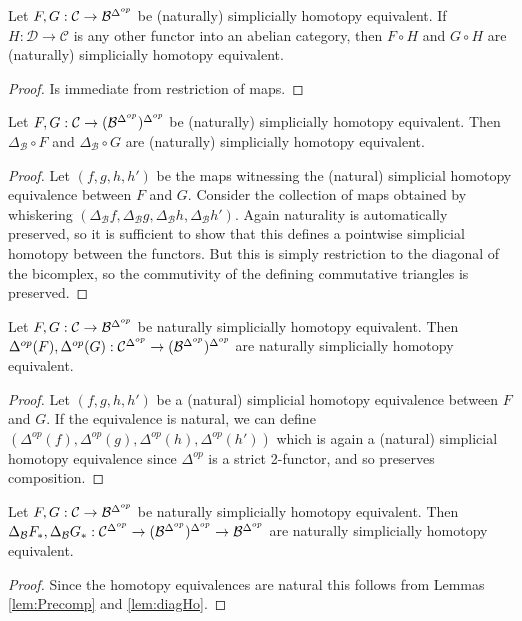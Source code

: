 \begin{lem}[label=lem:precompNat]
    Let $F,G: \mathcal{C}\rightarrow \mathcal{B}^{\Delta^{op}}$ be (naturally) simplicially homotopy equivalent. If $H:\mathcal{D}\rightarrow \mathcal{C}$ is any other functor into an abelian category, then $F\circ H$ and $G\circ H$ are (naturally) simplicially homotopy equivalent.
\end{lem}
\begin{proof}
    Is immediate from restriction of maps.
\end{proof}

\begin{lem}[label=lem:diagHo]
    Let $F,G: \mathcal{C}\rightarrow (\mathcal{B}^{\Delta^{op}})^{\Delta^{op}}$ be (naturally) simplicially homotopy equivalent. Then $\Delta_\mathcal{B}\circ F$ and $\Delta_\mathcal{B}\circ G$ are (naturally) simplicially homotopy equivalent.
\end{lem}
\begin{proof}
    Let $(f,g,h,h')$ be the maps witnessing the (natural) simplicial homotopy equivalence between $F$ and $G$. Consider the collection of maps obtained by whiskering $(\Delta_\mathcal{B}f,\Delta_\mathcal{B}g,\Delta_\mathcal{B}h,\Delta_\mathcal{B}h')$. Again naturality is automatically preserved, so it is sufficient to show that this defines a pointwise simplicial homotopy between the functors. But this is simply restriction to the diagonal of the bicomplex, so the commutivity of the defining commutative triangles is preserved.
\end{proof}


\begin{lem}[label=lem:Precomp]
    Let $F,G: \mathcal{C}\rightarrow \mathcal{B}^{\Delta^{op}}$ be naturally simplicially homotopy equivalent. Then $\Delta^{op}(F),\Delta^{op}(G): \mathcal{C}^{\Delta^{op}}\rightarrow (\mathcal{B}^{\Delta^{op}})^{\Delta^{op}}$ are naturally simplicially homotopy equivalent.
\end{lem}
\begin{proof}
    Let $(f,g,h,h')$ be a (natural) simplicial homotopy equivalence between $F$ and $G$. If the equivalence is natural, we can define $(\Delta^{op}(f),\Delta^{op}(g),\Delta^{op}(h),\Delta^{op}(h'))$ which is again a (natural) simplicial homotopy equivalence since $\Delta^{op}$ is a strict 2-functor, and so preserves composition.
\end{proof}



\begin{lem}[label=lem:PrecompDiag]
    Let $F,G: \mathcal{C}\rightarrow \mathcal{B}^{\Delta^{op}}$ be naturally simplicially homotopy equivalent. Then $\Delta_\mathcal{B}F_*,\Delta_\mathcal{B}G_*: \mathcal{C}^{\Delta^{op}}\rightarrow (\mathcal{B}^{\Delta^{op}})^{\Delta^{op}}\rightarrow \mathcal{B}^{\Delta^{op}}$ are naturally simplicially homotopy equivalent.
\end{lem}
\begin{proof}
    Since the homotopy equivalences are natural this follows from Lemmas \ref{lem:Precomp} and \ref{lem:diagHo}.
\end{proof}

